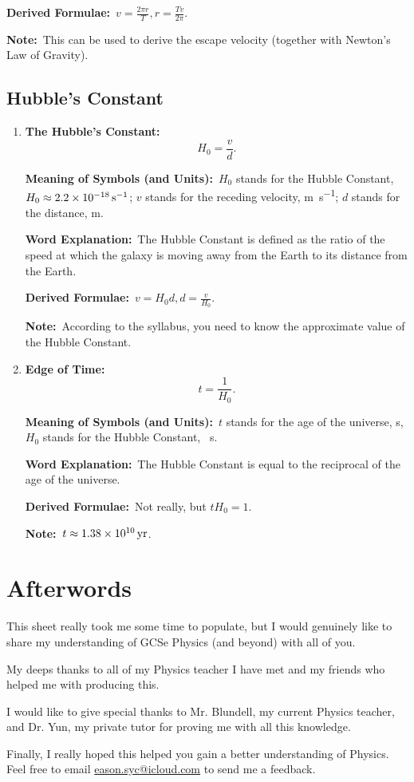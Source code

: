 \documentclass[8pt]{article}
\newcommand{\MeanSymb}{\textbf{Meaning of Symbols (and Units):}\ }
\newcommand{\WordExpl}{\textbf{Word Explanation:}\ }
\newcommand{\DeriForm}{\textbf{Derived Formulae:}\ }
\newcommand{\Note}{\textbf{Note:}\ }
\begin{document}
            \DeriForm \(v = \frac{2\pi r}{T}, r = \frac{Tv}{2\pi}\).

            \Note This can be used to derive the escape velocity (together with Newton's Law of Gravity).

        \subsection{Hubble's Constant}
            \begin{enumerate}
                \item \textbf{The Hubble's Constant:}
                \[
                    H_0 = \frac{v}{d}.
                \]

                \MeanSymb \(H_0\) stands for the Hubble Constant, \(H_0 \approx \qty{2.2 e -18}{\per \second}\); \(v\) stands for the receding velocity, \unit{\metre\per\second}; \(d\) stands for the distance, \unit{\metre}.

                \WordExpl The Hubble Constant is defined as the  ratio of the speed at which the galaxy is moving away from the Earth to its distance from the Earth.

                \DeriForm \(v = H_0 d, d = \frac{v}{H_0}\).

                \Note According to the syllabus, you need to know the approximate value of the Hubble Constant.

                \item \textbf{Edge of Time:}
                \[
                    t = \frac{1}{H_0}.
                \]

                \MeanSymb \(t\) stands for the age of the universe, \unit{\second}, \(H_0\) stands for the Hubble Constant, \unit{\per\second}.

                \WordExpl The Hubble Constant is equal to the reciprocal of the age of the universe.

                \DeriForm Not really, but \(t H_0 = 1\).

                \Note \(t \approx \qty{1.38 e 10}{\mathrm{yr}}\).
            \end{enumerate}

    \section*{Afterwords}
        This sheet really took me some time to populate, but I would genuinely like to share my understanding of GCSe Physics (and beyond) with all of you.
        
        My deeps thanks to all of my Physics teacher I have met and my friends who helped me with producing this.
        
        I would like to give special thanks to Mr. Blundell, my current Physics teacher, and Dr. Yun, my private tutor for proving me with all this knowledge.

        Finally, I really hoped this helped you gain a better understanding of Physics. Feel free to email \href{eason.syc@icloud.com}{eason.syc@icloud.com} to send me a feedback.
\end{document}
